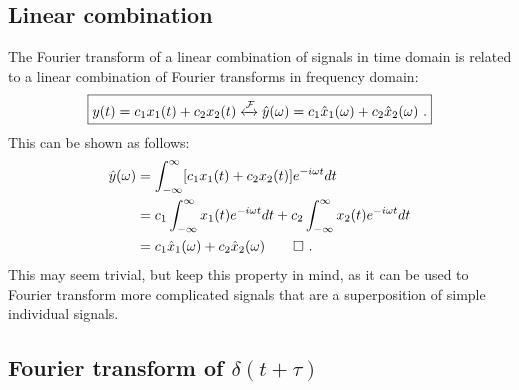 \subsection{Linear combination}
The Fourier transform of a linear combination of signals in time domain is related to a linear combination of Fourier transforms in frequency domain:
\begin{equation}
\boxed{
y(t)=c_1 x_1(t)  + c_2 x_2(t) \xleftrightarrow{\mathcal{F}} \hat{y}(\omega) = c_1\hat{x}_1(\omega)+c_2\hat{x}_2(\omega)\,\,.
}
\end{equation}
This can be shown as follows:
\begin{align}
\hat{y}(\omega) &= \int_{-\infty}^{\infty} [c_1 x_1(t)+c_2 x_2(t)] e^{-i\omega t} dt \\
&= c_1\int_{-\infty}^{\infty} x_1(t) e^{-i\omega t} dt + c_2\int_{-\infty}^{\infty} x_2(t) e^{-i\omega t} dt \\ 
&=  c_1\hat{x}_1(\omega)+c_2\hat{x}_2(\omega)\qed\,\,.
\end{align}
This may seem trivial, but keep this property in mind, as it can be used to Fourier transform more complicated signals that are a superposition of simple individual signals.

\subsection{Fourier transform of $\delta(t+\tau)$}


